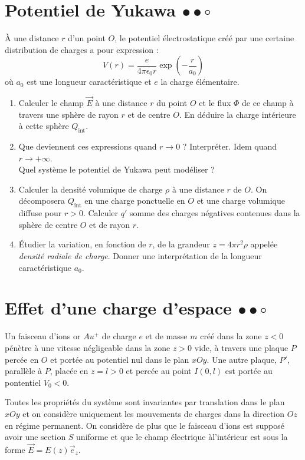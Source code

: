 \documentclass{report}
\begin{document}
\newpage

\section*{Potentiel de Yukawa $\bullet\bullet\circ$}

\`{A} une distance $r$ d'un point $O$, le potentiel électrostatique créé par une certaine distribution de charges a pour expression :
$$
V(r)=\frac{e}{4\pi \epsilon_0r}\exp\left( -\frac{r}{a_0}\right) 
$$
où $a_0$ est une longueur caractéristique et $e$ la charge élémentaire.

\begin{enumerate}
\item Calculer le champ $\vec{E}$ à une distance $r$ du point $O$ et le flux $\Phi$ de ce champ à travers une sphère de rayon $r$ et de centre $O$. En déduire la charge intérieure à cette sphère $Q_{\mathrm{int}}$. 
\item Que deviennent ces expressions quand $r\rightarrow 0$ ? Interpréter. Idem quand $r\rightarrow +\infty$.\\ Quel système le potentiel de Yukawa peut modéliser ?
\item Calculer la densité volumique de charge $\rho$ à une distance $r$ de $O$. On décomposera $Q_{\mathrm{int}}$ en une charge ponctuelle en $O$ et une charge volumique diffuse pour $r>0$. Calculer $q'$ somme des charges négatives contenues dans la sphère de centre $O$ et de rayon $r$.
\item \'{E}tudier la variation, en fonction de $r$, de la grandeur $z=4\pi r^2\rho$ appelée \textit{densité radiale de charge}. Donner une interprétation de la longueur caractéristique $a_0$.
\end{enumerate}

\newpage

\section*{Effet d'une charge d'espace $\bullet\bullet\circ$}

Un faisceau d'ions or $Au^+$ de charge $e$ et de masse $m$ créé dans la zone $z<0$ pénètre à une vitesse négligeable dans la zone $z>0$ vide, à travers une plaque $P$ percée en $O$ et portée au potentiel nul dans le plan $xOy$. Une autre plaque, $P'$, parallèle à $P$, placée en $z=l>0$ et percée au point $I(0,l)$ est portée au pontentiel $V_0<0$. 

Toutes les propriétés du système sont invariantes par translation dans le plan $xOy$ et on considère uniquement les mouvements de charges dans la direction $Oz$ en régime permanent. On considère de plus que le faisceau d'ions est supposé avoir une section $S$ uniforme et que le champ électrique  àl'intérieur est sous la forme $\vec{E}=E(z)\vec{e}_z$.
\end{document}
